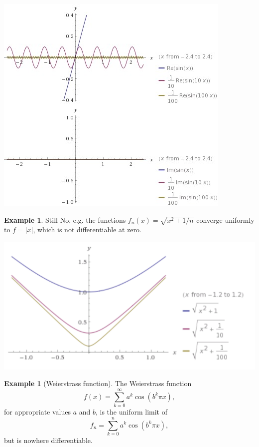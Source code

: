 \documentclass[12pt]{article}
\theoremstyle{plain}
\theoremstyle{definition}
\newtheorem{example}[theorem]{Example}
\theoremstyle{remark}
\begin{document}
\centerline{\includegraphics[scale=1]{uniformconvergence1}}

\begin{example}
Still No, e.g. the functions $f_n(x) = \sqrt{x^2 + 1/n}$ converge uniformly to $f = |x|$, which is not differentiable at zero.
\end{example}

\centerline{\includegraphics[scale=0.5]{uniformconvergence2}}

\begin{example}[Weierstrass function]
The Weierstrass function $$f(x) = \sum^\infty_{k=0} a^k \cos(b^k \pi x),$$ for appropriate values $a$ and $b$, is the uniform limit of $$f_n = \sum^n_{k=0} a^k \cos(b^k \pi x),$$ but is nowhere differentiable.
\end{example}
\end{document}
